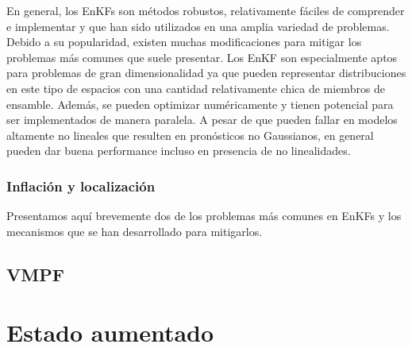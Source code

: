 En general, los EnKFs son métodos robustos, relativamente fáciles de comprender e implementar y que han sido utilizados en una amplia variedad de problemas. Debido a su popularidad, existen muchas modificaciones para mitigar los problemas más comunes que suele presentar. Los EnKF son especialmente aptos para problemas de gran dimensionalidad ya que pueden representar distribuciones en este tipo de espacios con una cantidad relativamente chica de miembros de ensamble. Además, se pueden optimizar numéricamente y tienen potencial para ser implementados de manera paralela. A pesar de que pueden fallar en modelos altamente no lineales que resulten en pronósticos no Gaussianos, en general pueden dar buena performance incluso en presencia de no linealidades.

\subsubsection{Inflación y localización}

Presentamos aquí brevemente dos de los problemas más comunes en EnKFs y los mecanismos que se han desarrollado para mitigarlos. 

\subsection{VMPF}
\section{Estado aumentado}
